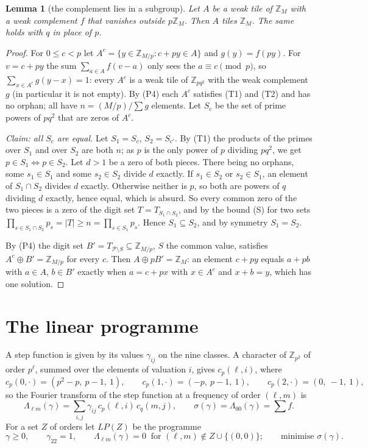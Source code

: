 \documentclass[11pt,a4paper]{amsart}
\newtheorem{lemma}[theorem]{Lemma}
\theoremstyle{definition}
\theoremstyle{remark}
\newcommand{\Z}{\mathbb{Z}}
\newcommand{\gs}{\gamma}
\begin{document}
\begin{lemma}[the complement lies in a subgroup]\label{lem:lift}
Let $A$ be a weak tile of $\Z_M$ with a weak complement $f$ that vanishes outside $p\Z_M$. Then $A$ tiles
$\Z_M$. The same holds with $q$ in place of $p$.
\end{lemma}
\begin{proof}
For $0\le c<p$ let $A^c=\{y\in\Z_{M/p}:c+py\in A\}$ and $g(y)=f(py)$. For $v=c+py$ the sum $\sum_{a\in A}f(v-a)$
only sees the $a\equiv c\pmod p$, so $\sum_{x\in A^c}g(y-x)=1$: every $A^c$ is a weak tile of $\Z_{pq^2}$ with the
weak complement $g$ (in particular it is not empty). By (P4) each $A^c$ satisfies (T1) and (T2) and has no
orphan; all have $n=(M/p)/\sum g$ elements. Let $S_c$ be the set of prime powers of $pq^2$ that are zeros of
$A^c$.

\emph{Claim: all $S_c$ are equal.} Let $S_1=S_c$, $S_2=S_{c'}$. By (T1) the products of the primes over $S_1$ and
over $S_2$ are both $n$; as $p$ is the only power of $p$ dividing $pq^2$, we get $p\in S_1\iff p\in S_2$. Let
$d>1$ be a zero of both pieces. There being no orphans, some $s_1\in S_1$ and some $s_2\in S_2$ divide $d$
exactly. If $s_1\in S_2$ or $s_2\in S_1$, an element of $S_1\cap S_2$ divides $d$ exactly. Otherwise neither is
$p$, so both are powers of $q$ dividing $d$ exactly, hence equal, which is absurd. So every common zero of the
two pieces is a zero of the digit set $T=T_{S_1\cap S_2}$, and by the bound (S) for two sets
$\prod_{s\in S_1\cap S_2}p_s=|T|\ge n=\prod_{s\in S_1}p_s$. Hence $S_1\subseteq S_2$, and by symmetry
$S_1=S_2$.

By (P4) the digit set $B'=T_{\mathcal P\setminus S}\subseteq\Z_{M/p}$, $S$ the common value, satisfies
$A^c\oplus B'=\Z_{M/p}$ for every $c$. Then $A\oplus pB'=\Z_M$: an element $c+py$ equals $a+pb$ with $a\in A$,
$b\in B'$ exactly when $a=c+px$ with $x\in A^c$ and $x+b=y$, which has one solution.
\end{proof}

\section{The linear programme}\label{sec:LP}

A step function is given by its values $\gs_{ij}$ on the nine classes. A character of $\Z_{p^2}$ of order
$p^\ell$, summed over the elements of valuation $i$, gives $c_p(\ell,i)$, where
\[
 c_p(0,\cdot)=(p^2-p,\ p-1,\ 1),\qquad c_p(1,\cdot)=(-p,\ p-1,\ 1),\qquad c_p(2,\cdot)=(0,\ -1,\ 1),
\]
so the Fourier transform of the step function at a frequency of order $(\ell,m)$ is
\[
 \Lambda_{\ell m}(\gs)=\sum_{i,j}\gs_{ij}\,c_p(\ell,i)\,c_q(m,j),\qquad \sigma(\gs)=\Lambda_{00}(\gs)=\sum f .
\]
For a set $Z$ of orders let $LP(Z)$ be the programme
\[
 \gs\ge0,\qquad \gs_{22}=1,\qquad \Lambda_{\ell m}(\gs)=0\ \text{ for } (\ell,m)\notin Z\cup\{(0,0)\};\qquad
 \text{minimise }\sigma(\gs).
\]
\end{document}
